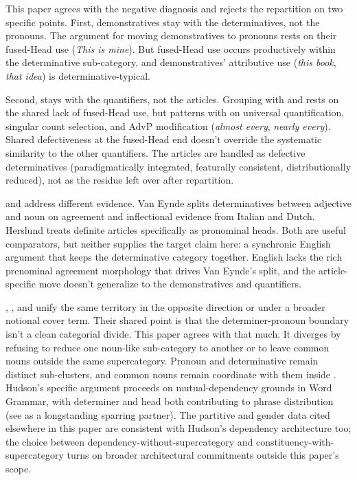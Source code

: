 \documentclass[12pt]{article}
\begin{document}
This paper agrees with the negative diagnosis and rejects the repartition on two specific points. First, demonstratives stay with the determinatives, not the pronouns. The argument for moving demonstratives to pronouns rests on their fused-Head use (\textit{This is mine}). But fused-Head use occurs productively within the determinative sub-category, and demonstratives' attributive use (\textit{this book}, \textit{that idea}) is determinative-typical.

Second,  stays with the quantifiers, not the articles. Grouping  with  and  rests on the shared lack of fused-Head use, but  patterns with  on universal quantification, singular count selection, and AdvP modification (\textit{almost every}, \textit{nearly every}). Shared defectiveness at the fused-Head end doesn't override the systematic similarity to the other quantifiers. The articles are handled as defective determinatives (paradigmatically integrated, featurally consistent, distributionally reduced), not as the residue left over after repartition.

\textcite{vaneynde2003determiner} and \textcite{herslund2008articles} address different evidence. Van Eynde splits determinatives between adjective and noun on agreement and inflectional evidence from Italian and Dutch. Herslund treats definite articles specifically as pronominal heads. Both are useful comparators, but neither supplies the target claim here: a synchronic English argument that keeps the determinative category together. English lacks the rich prenominal agreement morphology that drives Van Eynde's split, and the article-specific move doesn't generalize to the demonstratives and quantifiers.

\textcite{postal1966}, \textcite{hudson2004determiners}, and \textcite{anderson1997notional} unify the same territory in the opposite direction or under a broader notional cover term. Their shared point is that the determiner-pronoun boundary isn't a clean categorial divide. This paper agrees with that much. It diverges by refusing to reduce one noun-like sub-category to another or to leave common nouns outside the same supercategory. Pronoun and determinative remain distinct sub-clusters, and common nouns remain coordinate with them inside . Hudson's specific argument proceeds on mutual-dependency grounds in Word Grammar, with determiner and head both contributing to phrase distribution (see \textcite{vanlangendonck1994} as a longstanding sparring partner). The partitive and gender data cited elsewhere in this paper are consistent with Hudson's dependency architecture too; the choice between dependency-without-supercategory and constituency-with-supercategory turns on broader architectural commitments outside this paper's scope.
\end{document}

